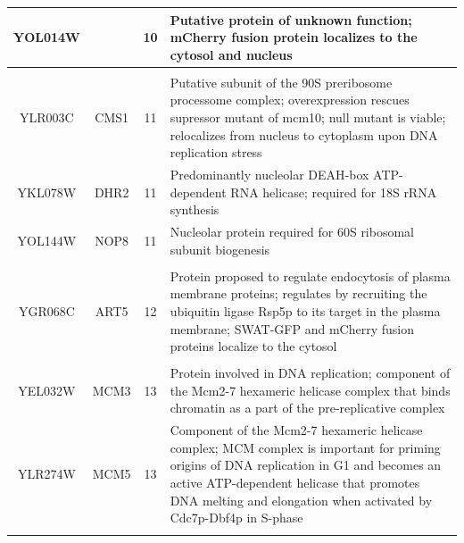 \documentclass[]{article}
\begin{document}
\begin{longtable}{@{\extracolsep{3pt}} cccp{85mm}}
		YOL014W &  & 10 & Putative protein of unknown function; mCherry fusion protein localizes to the cytosol and nucleus \\ \hline \\[-1.8ex]
		YLR003C & CMS1 & 11 & Putative subunit of the 90S preribosome processome complex; overexpression rescues supressor mutant of mcm10; null mutant is viable; relocalizes from nucleus to cytoplasm upon DNA replication stress \\ 
		YKL078W & DHR2 & 11 & Predominantly nucleolar DEAH-box ATP-dependent RNA helicase; required for 18S rRNA synthesis \\ 
		YOL144W & NOP8 & 11 & Nucleolar protein required for 60S ribosomal subunit biogenesis \\ \hline \\[-1.8ex]
		YGR068C & ART5 & 12 & Protein proposed to regulate endocytosis of plasma membrane proteins; regulates by recruiting the ubiquitin ligase Rsp5p to its target in the plasma membrane; SWAT-GFP and mCherry fusion proteins localize to the cytosol \\ \hline \\[-1.8ex]
		YEL032W & MCM3 & 13 & Protein involved in DNA replication; component of the Mcm2-7 hexameric helicase complex that binds chromatin as a part of the pre-replicative complex \\ 
		YLR274W & MCM5 & 13 & Component of the Mcm2-7 hexameric helicase complex; MCM complex is important for priming origins of DNA replication in G1 and becomes an active ATP-dependent helicase that promotes DNA melting and elongation when activated by Cdc7p-Dbf4p in S-phase \\ 
		\hline \\[-1.8ex] 
	\end{longtable} 
\end{document}
